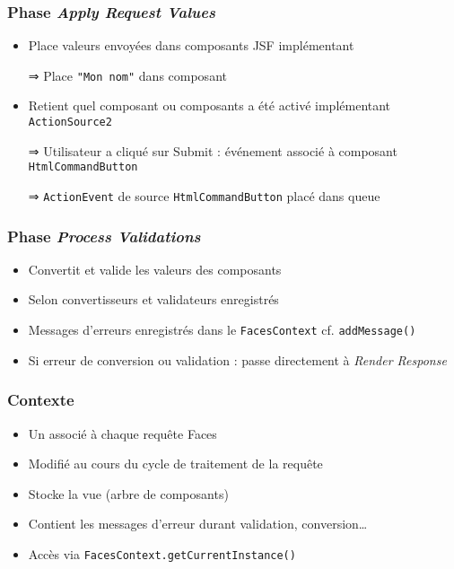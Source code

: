 \documentclass[english, french]{beamer}
\begin{document}
\begin{frame}[label=ph-arv]
	\frametitle{Phase \emph{Apply Request Values}}
	\begin{itemize}
		\item Place valeurs envoyées dans composants JSF {\tiny implémentant }
		\item[⇒] Place \texttt{"Mon nom"} dans composant 
		\item Retient quel composant {\tiny ou composants} a été activé {\tiny implémentant \texttt{ActionSource2}}
		\item[⇒] Utilisateur a cliqué sur \og{}Submit\fg{} : événement associé à composant \texttt{HtmlCommandButton}
		\item[⇒] {\tiny \texttt{ActionEvent} de source \texttt{HtmlCommandButton} placé dans queue}
	\end{itemize}
\end{frame}

\begin{frame}
	\frametitle{Phase \emph{Process Validations}}
	\begin{itemize}
		\item Convertit et valide les valeurs des composants
		\item Selon convertisseurs et validateurs enregistrés
		\item Messages d’erreurs enregistrés dans le \texttt{FacesContext} {\tiny cf. \texttt{addMessage()}}
		\item Si erreur de conversion ou validation : passe directement à \emph{Render Response}
	\end{itemize}
\end{frame}

\begin{frame}
	\frametitle{Contexte}
	\begin{itemize}
		\item Un  associé à chaque requête Faces
		\item Modifié au cours du cycle de traitement de la requête
		\item Stocke la vue (arbre de composants)
		\item Contient les messages d’erreur durant validation, conversion…
		\item Accès via \texttt{FacesContext.getCurrentInstance()}
	\end{itemize}
\end{frame}
\end{document}
